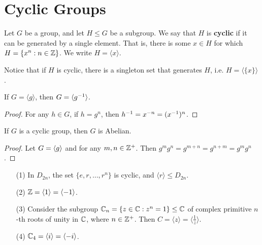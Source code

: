 \section{Cyclic Groups}
\label{section_2.3}

\begin{definition}
  Let $G$ be a group, and let  $H \leq G$ be a subgroup. We say that  $H$ is
  \textbf{cyclic} if it can be generated by a single element. That is, there
  is some $x \in H$ for which  $H=\{x^n : n \in \mathbb{Z}\}$. We write
  $H=\langle x \rangle$.
\end{definition}
\begin{remark}
  Notice that if $H$ is cyclic, there is a singleton set that generates  $H$,
  i.e.  $H=\langle \{x\} \rangle$.
\end{remark}

\begin{lemma}\label{lemma_2.3.1}
  If $G=\langle g \rangle$, then $G=\langle g^{-1} \rangle$.
\end{lemma}
\begin{proof}
  For any $h \in G$, if  $h=g^n$, then $h^{-1}=x^{-n}=(x^{-1})^n$.
\end{proof}

\begin{lemma}\label{lemma_2.3.2}
  If $G$ is a cyclic group, then  $G$ is Abelian.
\end{lemma}
\begin{proof}
  Let $G=\langle g\rangle$ and for any $m,n \in \mathbb{Z}^+$. Then
  $g^mg^n=g^{m+n}=g^{n+m}=g^mg^n$.
\end{proof}

\begin{example}
  \begin{enumerate}
    \item[(1)] In $D_{2n}$, the set $\{e,r, \dots, r^n\}$ is cyclic, and
      $\langle r \rangle \leq D_{2n}$.

    \item[(2)] $\mathbb{Z}= \langle 1 \rangle=\langle -1 \rangle$.

    \item[(3)] Consider the subgroup $\mathbb{C}_n=\{z \in \mathbb{C} : z^n=1\} \leq \mathbb{C}$ of
      complex primitive $n$-th roots of unity in $\mathbb{C}$, where  $n \in
      \mathbb{Z}^+$. Then $C=\langle z \rangle=\langle \frac{1}{z} \rangle$.

    \item[(4)] $\mathbb{C}_4=\langle i \rangle=\langle -i \rangle$.
  \end{enumerate}
\end{example}

